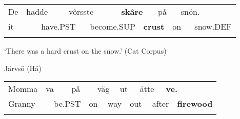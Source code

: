 \begin{tabular}{llllllllllll}
\lsptoprule
De & \multicolumn{2}{l}{hadde

} & \multicolumn{2}{l}{vôrsste

} & \multicolumn{2}{l}{{\bfseries skâre}

} & \multicolumn{2}{l}{på

} & \multicolumn{2}{l}{snön.

} & \\
\multicolumn{2}{l}{it

} & \multicolumn{2}{l}{have.PST

} & \multicolumn{2}{l}{become.SUP

} & \multicolumn{2}{l}{{\bfseries crust}

} & \multicolumn{2}{l}{on

} & \multicolumn{2}{l}{snow.DEF

}\\
\lspbottomrule
\end{tabular}

\begin{styleTranslation}
‘There was a hard crust on the snow.’ (Cat Corpus)

\end{styleTranslation}

\begin{listWWNumileveli}
\item 

\begin{styleExample}
Järvsö (Hä)

\end{styleExample}

\end{listWWNumileveli}

\begin{tabular}{llllllllllllll}
\lsptoprule
Momma & \multicolumn{2}{l}{va

} & \multicolumn{2}{l}{på

} & \multicolumn{2}{l}{väg

} & \multicolumn{2}{l}{ut

} & \multicolumn{2}{l}{ätte

} & \multicolumn{2}{l}{{\bfseries ve.}

} & \\
\multicolumn{2}{l}{Granny

} & \multicolumn{2}{l}{be.PST

} & \multicolumn{2}{l}{on

} & \multicolumn{2}{l}{way

} & \multicolumn{2}{l}{out

} & \multicolumn{2}{l}{after

} & \multicolumn{2}{l}{{\bfseries firewood}

}\\
\lspbottomrule
\end{tabular}

